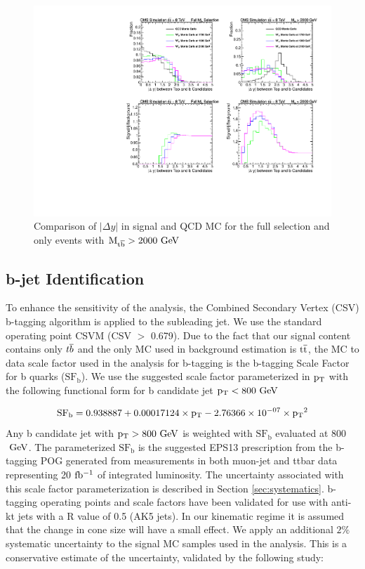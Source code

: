 \begin{figure}[htb]
\centering
\includegraphics[width=1.0\textwidth]{AN-13-004/figs/drapCompqcdandsignal}
\caption{Comparison of $|\Delta y|$ in signal and QCD MC for the full selection and only events with $\mathrm{M_{{t\overline{b}}}} > 2000~\mathrm{GeV}$}
\label{figs:CutComp}
\end{figure}



\subsection{b-jet Identification}
\label{sec:btagging}
To enhance the sensitivity of the analysis, the Combined Secondary Vertex (CSV) b-tagging algorithm is applied to the subleading jet. We use the standard operating point CSVM (CSV $>$ 0.679).
Due to the fact that our signal content 
contains only ${t\overline{b}}$ and the only MC used in background estimation is $\mathrm{t\overline{t}}$, the MC to data scale factor used in the analysis for b-tagging 
is the b-tagging Scale Factor for b quarks ($\mathrm{SF_b}$).  We use the suggested scale factor parameterized in $\mathrm{p_{T}}$ with the following functional form for 
b candidate jet $\mathrm{p_{T}} < 800~\mathrm{GeV}$

\begin{eqnarray}
\mathrm{SF_b = 0.938887 + 0.00017124\times \mathrm{p_{T}} - 2.76366 \times 10^{-07} \times \mathrm{p_{T}}^2} 
\end{eqnarray}
Any b candidate jet with $\mathrm{p_{T}} > 800~\mathrm{GeV}$ is weighted with $\mathrm{SF_b}$ evaluated at 800$~\mathrm{GeV}$.  The parameterized $\mathrm{SF_b}$ is the 
suggested EPS13 prescription \cite{CMS-PAS-BTV-13-001} from the b-tagging POG generated from measurements in both muon-jet and ttbar data representing 20$~\mathrm{fb^{-1}}$ of integrated 
luminosity. The uncertainty associated with this scale factor parameterization is described in Section \ref{sec:systematics}.  b-tagging operating points 
and scale factors have been validated for use with anti-kt jets with a R value of 0.5 (AK5 jets).  In our kinematic regime it is assumed that the change in cone size 
will have a small effect. We apply an additional $2\%$ systematic uncertainty to the signal MC samples used in the analysis. This is a conservative estimate of the uncertainty, validated by the following study: 

